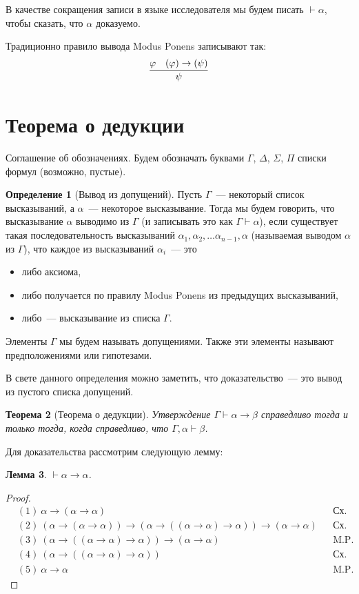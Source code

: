 \documentclass[a4paper,11pt]{article}
\newtheorem{thm}{Теорема}[section]
\newtheorem{lmm}[thm]{Лемма}
\theoremstyle{definition}
\newtheorem{dfn}[thm]{Определение}
\newcommand{\proves}{\vdash}
\begin{document}
В качестве сокращения записи в языке исследователя мы будем писать
$\proves \alpha$, чтобы сказать, что $\alpha$ доказуемо.

Традиционно правило вывода Modus Ponens записывают так:
\[ \infer{\psi}{\varphi & (\varphi) \to (\psi)} \]

\section{Теорема о дедукции}
Соглашение об обозначениях. Будем обозначать буквами $\Gamma$, $\Delta$,
$\Sigma$, $\Pi$ списки формул (возможно, пустые).

\begin{dfn}[Вывод из допущений]
Пусть $\Gamma$~--- некоторый список высказываний, а $\alpha$~--- некоторое
высказывание. Тогда мы будем говорить, что высказывание $\alpha$ выводимо из
$\Gamma$ (и записывать это как $\Gamma \proves \alpha$), если существует такая
последовательность высказываний $\alpha_1, \alpha_2, \dots \alpha_{n-1},
\alpha$ (называемая выводом $\alpha$ из $\Gamma$), что каждое из высказываний
$\alpha_i$~--- это
\begin{itemize}
\item либо аксиома,
\item либо получается по правилу Modus Ponens из предыдущих высказываний,
\item либо~--- высказывание из списка $\Gamma$.
\end{itemize}
Элементы $\Gamma$ мы будем называть допущениями. Также эти элементы называют
предположениями или гипотезами.
\end{dfn}

В свете данного определения можно заметить, что доказательство~--- это вывод из
пустого списка допущений.

\begin{thm}[Теорема о дедукции]\label{thm:deduction}
Утверждение $\Gamma \proves \alpha \to \beta$ справедливо тогда и только тогда,
когда справедливо, что $\Gamma, \alpha \proves \beta$.
\end{thm}

Для доказательства рассмотрим следующую лемму:

\begin{lmm}
$\proves \alpha \to \alpha$.
\end{lmm}
\begin{proof}
\begin{align*}
&(1)\ \alpha \to (\alpha \to \alpha) &&\text{Сх. акс. 1}\\
&(2)\ (\alpha \to (\alpha \to \alpha)) \to (\alpha \to ((\alpha \to \alpha) \to \alpha)) \to (\alpha \to \alpha) &&\text{Сх. акс. 2}\\
&(3)\ (\alpha \to ((\alpha \to \alpha) \to \alpha)) \to (\alpha \to \alpha) &&\text{M.P. 1,2}\\
&(4)\ (\alpha \to ((\alpha \to \alpha) \to \alpha)) &&\text{Сх. акс. 1}\\
&(5)\ \alpha \to \alpha &&\text{M.P. 4,3}
\end{align*}
\end{proof}
\end{document}
